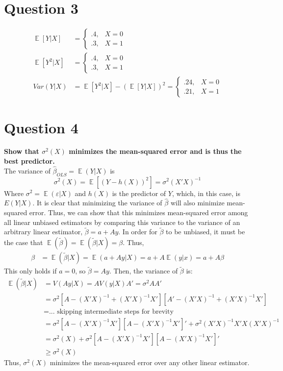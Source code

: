 \documentclass{article}
\newcommand{\tb}{\tilde{\beta}}
\DeclareMathOperator{\E}{\mathbb{E}}%
\begin{document}
\pagebreak
\section*{Question 3}
\begin{align*}
	\E[Y|X] &= \begin{cases} .4, & X= 0 \\ .3, & X = 1 \end{cases} \\
	\E[Y^2|X] &= \begin{cases} .4, & X= 0 \\ .3, & X = 1 \end{cases} \\
	Var(Y|X) &= \E[Y^2|X] - \left(\E[Y|X]\right)^2 = \begin{cases} .24, & X= 0 \\ .21, & X = 1 \end{cases} 
\end{align*}


\section*{Question 4}
\textbf{Show that $\sigma^2(X)$ minimizes the mean-squared error and is thus the best predictor.}
\bigskip \\
The variance of $\hat{\beta}_{OLS}=\E(Y|X)$ is
\[
	\sigma^2(X) = \E\left[\left(Y-h(X)\right)^2\right] = \sigma^2(X'X)^{-1}
\]
Where $\sigma^2=\E(\varepsilon|X)$ and $h(X)$ is the predictor of $Y$, which, in this case, is $E(Y|X)$. It is clear that minimizing the variance of $\hat{\beta}$ will also minimize mean-squared error. Thus, we can show that this minimizes mean-squared error among all linear unbiased estimators by comparing this variance to the variance of an arbitrary linear  estimator, $\tilde{\beta}=a+Ay$. In order for $\tb$ to be unbiased, it must be the case that ${\E(\tb)=\E(\tb|X)=\beta}$. Thus,
\begin{align*}
	\beta &= \E(\tb|X) = \E(a+Ay|X) = a + A\E(y|x) = a + A\beta
\end{align*}
This only holds if $a=0$, so $\tb=Ay$. Then, the variance of $\tb$ is:
\begin{align*}
	\E(\tb|X) 	&= V(Ay|X) = AV(y|X)A' = \sigma^2AA'														\\
				&= \sigma^2\left[A - (X'X)^{-1}+(X'X)^{-1}X'\right]\left[A'- (X'X)^{-1}+(X'X)^{-1}X'\right]	\\
				&= \text{... skipping intermediate steps for brevity}										\\
				&= \sigma^2[A-(X'X)^{-1}X'][A-(X'X)^{-1}X']' + \sigma^2(X'X)^{-1}X'X(X'X)^{-1}				\\
				&= \sigma^2(X) + \sigma^2[A-(X'X)^{-1}X'][A-(X'X)^{-1}X']'									\\
				&\geq \sigma^2(X)
\end{align*}
Thus, $\sigma^2(X)$ minimizes the mean-squared error over any other linear estimator.
\end{document}
